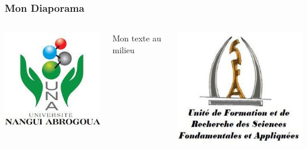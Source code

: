 \documentclass{beamer}
\begin{document}
	
	\begin{frame}
		\frametitle{Mon Diaporama}
		
		\begin{columns}
			\begin{column}{0.3\textwidth}
				\centering
				\includegraphics[width=\linewidth]{1}
			\end{column}
			\begin{column}{0.4\textwidth}
				\centering
				Mon texte au milieu
			\end{column}
			\begin{column}{0.3\textwidth}
				\centering
				\includegraphics[width=\linewidth]{2}
			\end{column}
		\end{columns}
		
	\end{frame}
	
\end{document}

